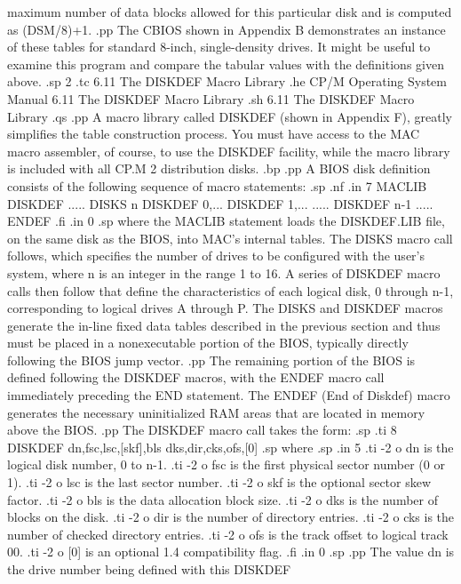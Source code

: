 maximum number of data blocks allowed for this particular disk 
and is computed as (DSM/8)+1.
.pp
The CBIOS shown in Appendix B demonstrates an instance of these 
tables for standard 8-inch, single-density drives.  It might be 
useful to examine this program and compare the tabular values 
with the definitions given above.
.sp 2
.tc    6.11  The DISKDEF Macro Library
.he CP/M Operating System Manual      6.11  The DISKDEF Macro Library
.sh
6.11  The DISKDEF Macro Library
.qs
.pp
A macro library called DISKDEF (shown in Appendix F), greatly 
simplifies the table construction process.  You must have access 
to the MAC macro assembler, of course, to use the DISKDEF 
facility, while the macro library is included with all CP.M 2 
distribution disks.
.bp
.pp
A BIOS disk definition consists of the following sequence of 
macro statements:
.sp
.nf
.in 7
 MACLIB         DISKDEF
 .....
 DISKS          n
 DISKDEF        0,...
 DISKDEF        1,...
 .....
 DISKDEF        n-1
 .....
 ENDEF
.fi
.in 0
.sp
where the MACLIB statement loads the DISKDEF.LIB file, on the 
same disk as the BIOS, into MAC's internal tables.  The DISKS 
macro call follows, which specifies the number of drives to be 
configured  with the user's system, where n is an integer in the 
range 1 to 16.  A series of DISKDEF macro calls then follow that 
define the characteristics of each logical disk, 0 through n-1, 
corresponding to logical drives A through P.  The DISKS and 
DISKDEF macros generate the in-line fixed data tables described 
in the previous section and thus must be placed in a 
nonexecutable portion of the BIOS, typically directly following 
the BIOS jump vector.
.pp
The remaining portion of the BIOS is defined following the 
DISKDEF macros, with the ENDEF macro call immediately preceding 
the END statement.  The ENDEF (End of Diskdef) macro generates 
the necessary uninitialized RAM areas that are located in 
memory above the BIOS. 
.pp
The DISKDEF macro call takes the form:
.sp
.ti 8
DISKDEF  dn,fsc,lsc,[skf],bls dks,dir,cks,ofs,[0]
.sp
where
.sp
.in 5
.ti -2
o dn is the logical disk number, 0 to n-1.
.ti -2
o fsc is the first physical sector number (0 or 1).
.ti -2
o lsc is the last sector number.
.ti -2
o skf is the optional sector skew factor.
.ti -2
o bls is the data allocation block size.
.ti -2
o dks is the number of blocks on the disk.
.ti -2
o dir is the number of directory entries.
.ti -2
o cks is the number of checked directory entries.
.ti -2
o ofs is the track offset to logical track 00.
.ti -2
o [0] is an optional 1.4 compatibility flag.
.fi
.in 0
.sp
.pp
The value dn is the drive number being defined with this DISKDEF 
